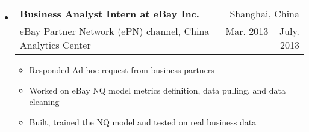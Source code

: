 \documentclass[letterpaper,10pt]{article}
\makeatletter
\newcommand{\resitem}[1]{\item #1 \vspace{-2pt}}
\newcommand{\resheading}[1]{{\large \colorbox{mygrey}{\begin{minipage}{\textwidth}{\textbf{#1 \vphantom{p\^{E}}}}\end{minipage}}}}
\newcommand{\ressubheading}[4]{
\begin{tabular*}{6.5in}{l@{\extracolsep{\fill}}r}
		\textbf{#1} & #2 \\
		#3 & #4 \\
\end{tabular*}\vspace{-6pt}}
\makeatother
\begin{document}
	\begin{itemize}
		\item
			\ressubheading{Business Analyst Intern at eBay Inc.}{Shanghai, China}{eBay Partner Network (ePN) channel, China Analytics Center}{Mar. 2013 -- July. 2013}
			{\begin{itemize}
                \resitem{Responded Ad-hoc request from business partners}
 				\resitem{Worked on eBay NQ model metrics definition, data pulling, and data cleaning}
 				\resitem{Built, trained the NQ model and tested on real business data}
			\end{itemize}
			}







\end{itemize}
\end{document}
